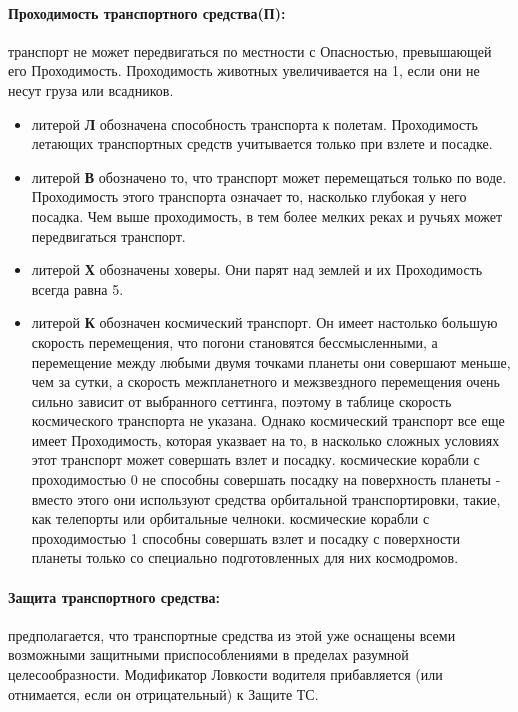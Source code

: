 \paragraph{Проходимость транспортного средства(П):} транспорт не может передвигаться по местности с Опасностью, превышающей его Проходимость. Проходимость животных увеличивается на 1, если они не несут груза или всадников.
\begin{itemize}
\item литерой \textbf{Л} обозначена способность транспорта к полетам. Проходимость летающих транспортных средств учитывается только при взлете и посадке.
\item литерой \textbf{В} обозначено то, что транспорт может перемещаться только по воде. Проходимость этого транспорта означает то, насколько глубокая у него посадка. Чем выше проходимость, в тем более мелких реках и ручьях может передвигаться транспорт.
\item литерой \textbf{Х} обозначены ховеры. Они парят над землей и их Проходимость всегда равна 5.
\item литерой \textbf{К} обозначен космический транспорт. Он имеет настолько большую скорость перемещения, что погони становятся бессмысленными, а перемещение между любыми двумя точками планеты они совершают меньше, чем за сутки, а скорость межпланетного и межзвездного перемещения очень сильно зависит от выбранного сеттинга, поэтому в таблице скорость космического транспорта не указана. Однако космический транспорт все еще имеет Проходимость, которая указвает на то, в насколько сложных условиях этот транспорт может совершать взлет и посадку.
\newline космические корабли с проходимостью 0 не способны совершать посадку на поверхность планеты - вместо этого они используют средства орбитальной транспортировки, такие, как телепорты или орбитальные челноки.
\newline космические корабли с проходимостью 1 способны совершать взлет и посадку с поверхности планеты только со специально подготовленных для них космодромов.
\end{itemize}
\paragraph{Защита транспортного средства:} предполагается, что транспортные средства из этой уже оснащены всеми возможными защитными приспособлениями в пределах разумной целесообразности. Модификатор Ловкости водителя прибавляется (или отнимается, если он отрицательный) к Защите ТС.
